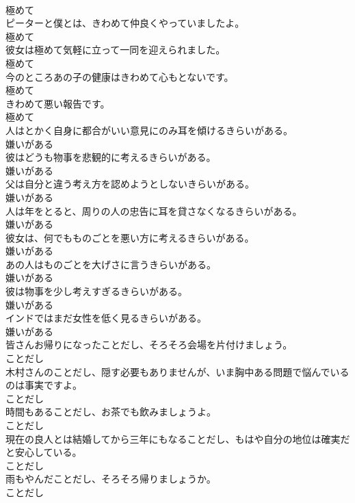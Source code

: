 \documentclass[8pt]{extreport}
\begin{document}
\begin{CJK}{UTF8}{min}
\\	極めて	
\\	ピーターと僕とは、きわめて仲良くやっていましたよ。	
\\	極めて	
\\	彼女は極めて気軽に立って一同を迎えられました。	
\\	極めて	
\\	今のところあの子の健康はきわめて心もとないです。	
\\	極めて	
\\	きわめて悪い報告です。	
\\	極めて	
\\	人はとかく自身に都合がいい意見にのみ耳を傾けるきらいがある。	
\\	嫌いがある	
\\	彼はどうも物事を悲観的に考えるきらいがある。	
\\	嫌いがある	
\\	父は自分と違う考え方を認めようとしないきらいがある。	
\\	嫌いがある	
\\	人は年をとると、周りの人の忠告に耳を貸さなくなるきらいがある。	
\\	嫌いがある	
\\	彼女は、何でもものごとを悪い方に考えるきらいがある。	
\\	嫌いがある	
\\	あの人はものごとを大げさに言うきらいがある。	
\\	嫌いがある	
\\	彼は物事を少し考えすぎるきらいがある。	
\\	嫌いがある	
\\	インドではまだ女性を低く見るきらいがある。	
\\	嫌いがある	
\\	皆さんお帰りになったことだし、そろそろ会場を片付けましょう。	
\\	ことだし	
\\	木村さんのことだし、隠す必要もありませんが、いま胸中ある問題で悩んでいるのは事実ですよ。	
\\	ことだし	
\\	時間もあることだし、お茶でも飲みましょうよ。	
\\	ことだし	
\\	現在の良人とは結婚してから三年にもなることだし、もはや自分の地位は確実だと安心している。	
\\	ことだし	
\\	雨もやんだことだし、そろそろ帰りましょうか。	
\\	ことだし	

\end{CJK}
\end{document}
